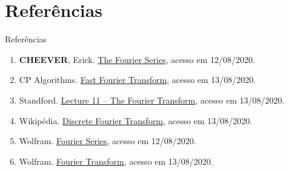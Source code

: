 \section{Referências}

\begin{frame}[fragile]{Referências}

    \begin{enumerate}
        \item \textbf{CHEEVER}, Erick. \href{https://lpsa.swarthmore.edu/Fourier/Series/WhyFS.html}
            {The Fourier Series}, acesso em 12/08/2020.

        \item CP Algorithms. \href{https://cp-algorithms.com/algebra/fft.html}{Fast Fourier
            Transform}, acesso em 13/08/2020.
 
        \item Standford. \href{https://web.stanford.edu/class/ee102/lectures/fourtran}{Lecture 11
            -- The Fourier Transform}, acesso em 13/08/2020.

        \item Wikipédia. \href{https://en.wikipedia.org/wiki/Discrete_Fourier_transform}{Discrete
            Fourier Transform}, acesso em 13/08/2020.
 
        \item Wolfram. \href{https://mathworld.wolfram.com/FourierSeries.html}{Fourier Series},
            acesso em 12/08/2020.

        \item Wolfram. \href{https://mathworld.wolfram.com/FourierTransform.html}{Fourier
            Transform}, acesso em 13/08/2020.
 
    \end{enumerate}

\end{frame}
